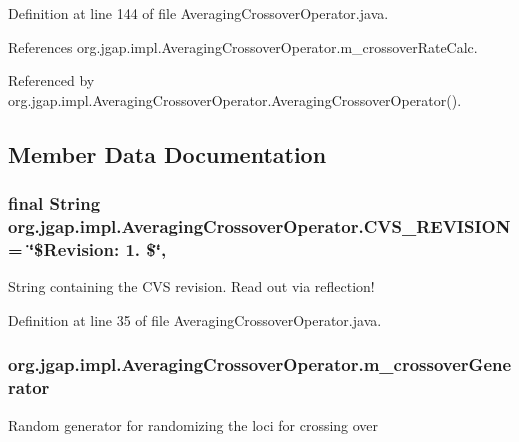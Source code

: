 Definition at line 144 of file Averaging\-Crossover\-Operator.\-java.



References org.\-jgap.\-impl.\-Averaging\-Crossover\-Operator.\-m\-\_\-crossover\-Rate\-Calc.



Referenced by org.\-jgap.\-impl.\-Averaging\-Crossover\-Operator.\-Averaging\-Crossover\-Operator().



\subsection{Member Data Documentation}
\hypertarget{classorg_1_1jgap_1_1impl_1_1_averaging_crossover_operator_abe86441786d8a0e6133096021230594c}{
\subsubsection[{C\-V\-S\-\_\-\-R\-E\-V\-I\-S\-I\-O\-N}]{\setlength{\rightskip}{0pt plus 5cm}final String org.\-jgap.\-impl.\-Averaging\-Crossover\-Operator.\-C\-V\-S\-\_\-\-R\-E\-V\-I\-S\-I\-O\-N = \char`\"{}\$Revision\-: 1. \$\char`\"{}\hspace{0.3cm}{\ttfamily [static]}, {\ttfamily [private]}}}\label{classorg_1_1jgap_1_1impl_1_1_averaging_crossover_operator_abe86441786d8a0e6133096021230594c}
String containing the C\-V\-S revision. Read out via reflection! 

Definition at line 35 of file Averaging\-Crossover\-Operator.\-java.

\hypertarget{classorg_1_1jgap_1_1impl_1_1_averaging_crossover_operator_a613f7b49028a51994326f663f312f4a3}{
\subsubsection[{m\-\_\-crossover\-Generator}]{ org.\-jgap.\-impl.\-Averaging\-Crossover\-Operator.\-m\-\_\-crossover\-Generator\hspace{0.3cm}{\ttfamily [private]}}}\label{classorg_1_1jgap_1_1impl_1_1_averaging_crossover_operator_a613f7b49028a51994326f663f312f4a3}
Random generator for randomizing the loci for crossing over 

